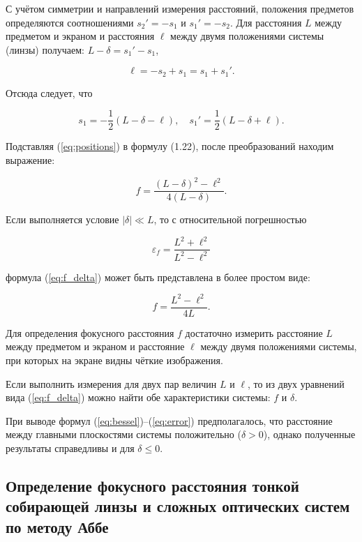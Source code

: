 С учётом симметрии и направлений измерения расстояний, положения предметов определяются соотношениями $s_2' = -s_1$ и $s_1' = -s_2$. Для расстояния $L$ между предметом и экраном и расстояния $\ell$ между двумя положениями системы (линзы) получаем: $L - \delta = s_1' - s_1$,

\begin{equation}
\ell = -s_2 + s_1 = s_1 + s_1'.
\label{eq:ell}
\end{equation}

Отсюда следует, что

\begin{equation}
s_1 = -\frac{1}{2}(L - \delta - \ell), \quad s_1' = \frac{1}{2}(L - \delta + \ell).
\label{eq:positions}
\end{equation}

Подставляя (\ref{eq:positions}) в формулу (1.22), после преобразований находим выражение:

\begin{equation}
f = \frac{(L - \delta)^2 - \ell^2}{4(L - \delta)}.
\label{eq:f_delta}
\end{equation}

Если выполняется условие $|\delta| \ll L$, то с относительной погрешностью

\begin{equation}
\varepsilon_f = \frac{L^2 + \ell^2}{L^2 - \ell^2}
\label{eq:error}
\end{equation}

формула (\ref{eq:f_delta}) может быть представлена в более простом виде:

\begin{equation}
f = \frac{L^2 - \ell^2}{4L}.
\label{eq:f_simple}
\end{equation}

Для определения фокусного расстояния $f$ достаточно измерить расстояние $L$ между предметом и экраном и расстояние $\ell$ между двумя положениями системы, при которых на экране видны чёткие изображения. 

Если выполнить измерения для двух пар величин $L$ и $\ell$, то из двух уравнений вида (\ref{eq:f_delta}) можно найти обе характеристики системы: $f$ и $\delta$.

При выводе формул (\ref{eq:bessel})–(\ref{eq:error}) предполагалось, что расстояние между главными плоскостями системы положительно ($\delta > 0$), однако полученные результаты справедливы и для $\delta \leq 0$.

\subsection*{Определение фокусного расстояния тонкой собирающей линзы и сложных оптических систем по методу Аббе}

